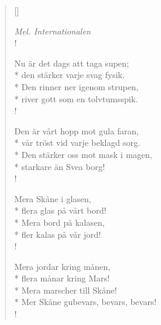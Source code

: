 
\settowidth{\versewidth}{Den rinner ner igenom strupen,}



\begin{verse}[\versewidth]

\flagverse{}
\emph{Mel. Internationalen}\\!

Nu är det dags att taga supen;\\*
den stärker varje svag fysik.\\*
Den rinner ner igenom strupen,\\*
river gott som en tolvtumsspik.\\!


Den är vårt hopp mot gula faran,\\*
vår tröst vid varje beklagd sorg.\\*
Den stärker oss mot mask i magen,\\*
starkare än Svea borg!\\!


Mera Skåne i glasen,\\*
flera glas på vårt bord!\\*
Mera bord på kalasen,\\*
fler kalas på vår jord!\\!


Mera jordar kring månen,\\*
flera månar kring Mars!\\*
Mera marscher till Skåne!\\*
Mer Skåne gubevars, bevars, bevars!\\!


\end{verse}

